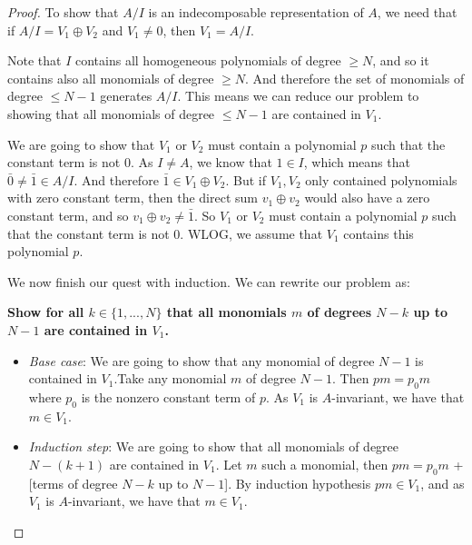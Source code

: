 \begin{proof}

To show that \(A/I\) is an indecomposable representation of \(A\), we need that if \(A/I=V_{1}\oplus V_{2}\) and \(V_{1}\neq 0\), then \(V_{1}=A/I\).

Note that \(I\) contains all homogeneous polynomials of degree \(\geq N\), and so it contains also all monomials of degree \(\geq N\). And therefore the set of monomials of degree \(\leq N-1\) generates \(A/I\).  This means we can reduce our problem to showing that all monomials of degree \(\leq N-1\) are contained in \(V_{1}\).

We are going to show that \(V_{1}\) or \(V_{2}\) must contain a polynomial \(p\) such that the constant term is not \(0\). As \(I\neq A\), we know that \(1\in I\), which means that \(\bar{0}\neq \bar{1}\in A/I\). And therefore \(\bar{1}\in V_{1}\oplus V_{2}\). But if \(V_{1},V_{2}\) only contained polynomials with zero constant term, then the direct sum \(v_{1}\oplus v_{2}\) would also have a zero constant term, and so \(v_{1}\oplus v_{2}\neq \bar{1}\). So \(V_{1}\) or \(V_{2}\) must contain a polynomial \(p\) such that the constant term is not \(0\). WLOG, we assume that \(V_{1}\) contains this polynomial \(p\).

We now finish our quest with induction. We can rewrite our problem as:

\textbf{Show for all \(k\in \{1,...,N\}\) that all monomials \(m\) of degrees \(N-k\) up to \(N-1\) are contained in \(V_{1}\).}

\begin{itemize}
  \item \emph{Base case}: We are going to show that any monomial of degree \(N-1\) is contained in \(V_{1}\).Take any monomial \(m\) of degree \(N-1\). Then \(pm=p_{0}m\) where \(p_{0}\) is the nonzero constant term of \(p\). As \(V_{1}\) is \(A\)-invariant, we have that \(m\in V_{1}\).
  \item \emph{Induction step}: We are going to show that all monomials of degree \(N-(k+1)\) are contained in \(V_{1}\). Let \(m\) such a monomial, then \(pm=p_{0}m\) + [terms of degree \(N-k\) up to \(N-1\)]. By induction hypothesis $pm\in V_{1}$, and as \(V_{1}\) is \(A\)-invariant, we have that \(m\in V_{1}\).
\end{itemize}

\end{proof}
